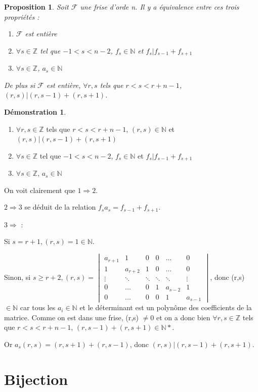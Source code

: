 \documentclass[a4paper]{article}
\theoremstyle{plain}
\newtheorem{prop}[thm]{Proposition}
\theoremstyle{definition}
\theoremstyle{proof}
\newtheorem{dem}{Démonstration}
\theoremstyle{remark}
\begin{document}
\begin{prop}
Soit $\mathcal{F}$ une frise d'orde n. Il y a équivalence entre ces trois propriétés :
\begin{enumerate}
\item $\mathcal{F}$ est entière
\item $\forall s \in \mathbb{Z}$ tel que $-1<s<n-2$, $f_s\in \mathbb{N}$ et $f_s|f_{s-1}+f_{s+1}$
\item $\forall s\in \mathbb{Z}$, $a_s \in \mathbb{N}$
\end{enumerate}

De plus si $\mathcal{F}$ est entière, $\forall r, s$ tels que $r<s<r+n-1$, $(r,s)|(r,s-1)+(r,s+1)$.
\end{prop}

\begin{dem}
\begin{enumerate}
\item $\forall r, s \in \mathbb{Z}$ tels que $r<s<r+n-1$, $(r,s)\in \mathbb{N}$ et$(r,s)|(r,s-1)+(r,s+1)$
\item$\forall s \in \mathbb{Z}$ tel que $-1<s<n-2$, $f_s\in \mathbb{N}$ et $f_s|f_{s-1}+f_{s+1}$
\item $\forall s\in \mathbb{Z}$, $a_s \in \mathbb{N}$
\end{enumerate}

On voit clairement que $1 \Rightarrow 2$. 

$2 \Rightarrow 3$ se déduit de la relation $f_sa_s=f_{s-1}+f_{s+1}$.

$3 \Rightarrow$ :

Si $s=r+1,(r,s)=1 \in \mathbb{N}$.

Sinon, si $s \ge r+2, (r,s)=\begin{vmatrix}
a_{r+1}&1&0&0&...&0\\
1& a_{r+2}&1&0&...&0\\
\vdots&\ddots&\ddots&\ddots&\ddots&\vdots\\
0&...&0&1&a_{s-2}&1\\
0&...&0&0&1&a_{s-1}
\end{vmatrix}$, donc (r,s) $\in \mathbb{N}$ car tous les $a_i \in \mathbb{N}$ et le déterminant est un polynôme des coefficients de la matrice. Comme on est dans une frise, (r,s) $\neq$0 et on a donc bien $\forall r,s \in \mathbb{Z}$ tels que $r<s<r+n-1$, $(r,s-1)+(r,s+1)\in \mathbb{N*}$.

Or $a_s(r,s)=(r,s+1)+(r,s-1)$, donc $(r,s)|(r,s-1)+(r,s+1)$.
\end{dem}
\part{Bijection}
\end{document}
